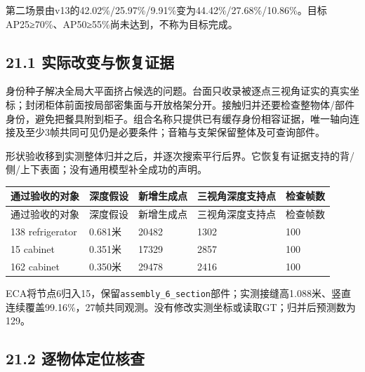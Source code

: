 \documentclass[UTF8,fontset=fandol]{ctexart}
\begin{document}
第二场景由v13的42.02\%/25.97\%/9.91\%变为44.42\%/27.68\%/10.86\%。目标AP25≥70\%、AP50≥55\%尚未达到，不称为目标完成。



\subsection*{21.1 实际改变与恢复证据}

身份种子解决全局大平面挤占候选的问题。台面只收录被逐点三视角证实的真实坐标；封闭柜体前面按局部密集面与开放格架分开。接触归并还要检查整物体/部件身份，避免把餐具附到柜子。组合名称只提供已有缓存身份相容证据，唯一轴向连接及至少3帧共同可见仍是必要条件；音箱与支架保留整体及可查询部件。



形状验收移到实测整体归并之后，并逐次搜索平行后界。它恢复有证据支持的背/侧/上下表面；没有通用模型补全成功的声明。



{\small
\begin{longtable}{|p{}|p{}|p{}|p{}|p{}|}
\hline
通过验收的对象 & 深度假设 & 新增生成点 & 三视角深度支持点 & 检查帧数 \\ \hline
\endfirsthead
\hline
通过验收的对象 & 深度假设 & 新增生成点 & 三视角深度支持点 & 检查帧数 \\ \hline
\endhead
138 refrigerator & 0.681米 & 20482 & 1302 & 100 \\ \hline
15 cabinet & 0.351米 & 17329 & 2857 & 100 \\ \hline
162 cabinet & 0.350米 & 29478 & 2416 & 100 \\ \hline
\end{longtable}
}

ECA将节点6归入15，保留\texttt{assembly\_\allowbreak{}6\_\allowbreak{}section}部件；实测接缝高1.088米、竖直连续覆盖99.16\%，27帧共同观测。没有修改实测坐标或读取GT；归并后预测数为129。



\subsection*{21.2 逐物体定位核查}
\end{document}
